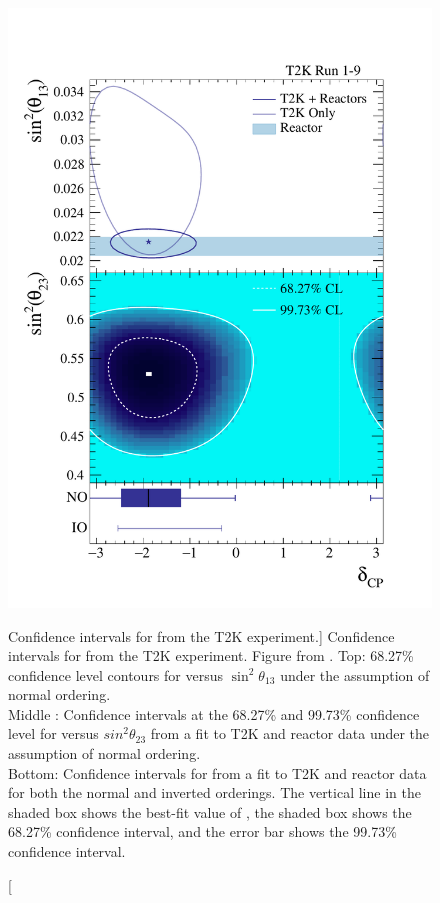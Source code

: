 \begin{figure}
	\centering
	\includegraphics[height=0.6\textheight]{figures/t2k_cp.pdf}
	\caption
	[Confidence intervals for \dcp{} from the T2K experiment.]
	{Confidence intervals for \dcp{} from the T2K experiment. Figure from 
	\cite{Abe2019}. 
	Top: 68.27\% confidence level contours for \dcp{} versus $\sin^2\theta_{13}$ 
	under the assumption of normal ordering. \\
	Middle : Confidence intervals at the 68.27\% and 99.73\% confidence level for 
	\dcp{} versus $sin^2\theta_{23}$ from a fit to T2K and reactor data under the 
	assumption of normal ordering. \\
	Bottom: Confidence intervals for \dcp{} from a fit to T2K and reactor data for 
	both the normal and inverted orderings. The vertical line in the shaded box 
	shows the best-fit value of \dcp{}, the shaded box shows the 68.27\% 
	confidence interval, and the error bar shows the 99.73\% confidence interval. 
	}
	\label{fig:t2k_cp}
\end{figure}

